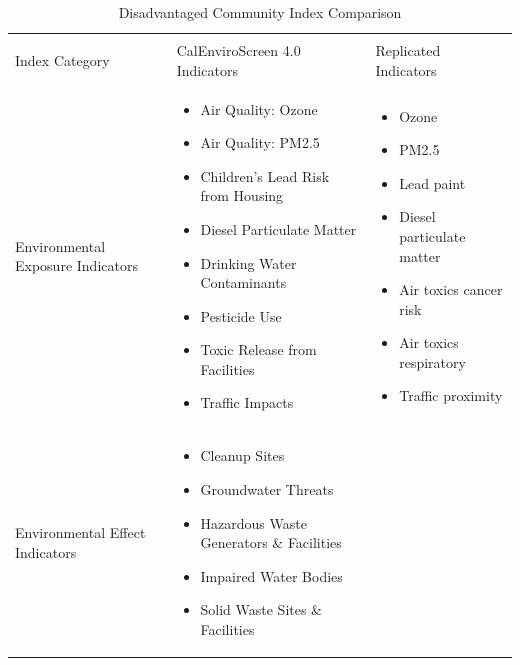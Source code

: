 \begin{table}
    \centering
    \caption{Disadvantaged Community Index Comparison \label{DAC_crosswalk}}
    \small
    \begin{tabular}{L{0.2\textwidth} L{0.35\textwidth} L{0.35\textwidth}}
        \hline\hline \\ [-1.8ex]
        Index Category & CalEnviroScreen 4.0 Indicators & Replicated Indicators\\
        \hline
        Environmental Exposure Indicators & 
        \begin{itemize}[noitemsep, topsep=0pt]
            \item Air Quality: Ozone
            \item Air Quality: PM2.5
            \item Children's Lead Risk from Housing
            \item Diesel Particulate Matter
            \item Drinking Water Contaminants
            \item Pesticide Use
            \item Toxic Release from Facilities
            \item Traffic Impacts 
        \end{itemize} &
        \begin{itemize}[noitemsep, topsep=0pt]
            \item Ozone
            \item PM2.5
            \item Lead paint
            \item Diesel particulate matter
            \item Air toxics cancer risk
            \item Air toxics respiratory
            \item Traffic proximity
        \end{itemize} \\
        \hline
        Environmental Effect Indicators &
        \begin{itemize}[noitemsep, topsep=0pt]
            \item Cleanup Sites
            \item Groundwater Threats
            \item Hazardous Waste Generators \& Facilities
            \item Impaired Water Bodies
            \item Solid Waste Sites \& Facilities

\end{itemize}
\end{tabular}
\end{table}
